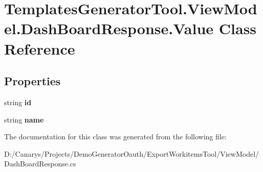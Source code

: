 \hypertarget{class_templates_generator_tool_1_1_view_model_1_1_dash_board_response_1_1_value}{}\section{Templates\+Generator\+Tool.\+View\+Model.\+Dash\+Board\+Response.\+Value Class Reference}
\label{class_templates_generator_tool_1_1_view_model_1_1_dash_board_response_1_1_value}
\subsection*{Properties}
\begin{DoxyCompactItemize}
\item 
\mbox{\label{class_templates_generator_tool_1_1_view_model_1_1_dash_board_response_1_1_value_a2ab5be1725142fda437ce22e08cb4145}} 
string {\bfseries id}
\item 
\mbox{\label{class_templates_generator_tool_1_1_view_model_1_1_dash_board_response_1_1_value_ae9a8e23fe4d04e457fdb50d840254255}} 
string {\bfseries name}
\end{DoxyCompactItemize}


The documentation for this class was generated from the following file\+:\begin{DoxyCompactItemize}
\item 
D\+:/\+Canarys/\+Projects/\+Demo\+Generator\+Oauth/\+Export\+Workitems\+Tool/\+View\+Model/Dash\+Board\+Response.\+cs\end{DoxyCompactItemize}
